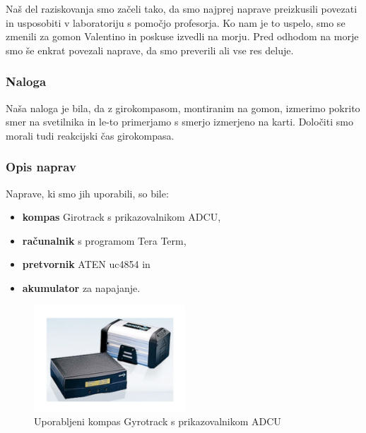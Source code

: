 Naš del raziskovanja smo začeli tako, da smo najprej naprave preizkusili povezati in usposobiti v laboratoriju s pomočjo profesorja. Ko nam je to uspelo, smo se zmenili za gomon Valentino in poskuse izvedli na morju. Pred odhodom na morje smo še enkrat povezali naprave, da smo preverili ali vse res deluje.

\subsubsection{Naloga}
Naša naloga je bila, da z girokompasom, montiranim na gomon, izmerimo pokrito smer na svetilnika in le-to primerjamo s smerjo izmerjeno na karti. Določiti smo morali tudi reakcijski čas girokompasa.

\subsubsection{Opis naprav}
Naprave, ki smo jih uporabili, so bile:
\begin{itemize}
	\item \textbf{kompas} Girotrack s prikazovalnikom ADCU, 
	\item \textbf{računalnik} s programom Tera Term, 
	\item \textbf{pretvornik} ATEN uc4854 in 
	\item \textbf{akumulator} za napajanje.
\end{itemize}  

\begin{figure}
	\centering
	\includegraphics[height=4cm]{Vaje/VzorecPoroc/figs/Gyrotrac_slika.pdf}
	\caption{Uporabljeni kompas Gyrotrack s prikazovalnikom ADCU}
	\label{fig:GT}       %
\end{figure}


